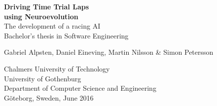 \begin{titlepage}
			
\addtolength{\voffset}{2cm}

\begin{figure}[H]
\centering
\vspace{1cm}	%
\end{figure}
\setlength{\parindent}{0ex}
\mbox{}
\vfill
\renewcommand{\familydefault}{\sfdefault} \normalfont %


\textbf{{\Huge Driving Time Trial Laps \\using Neuroevolution}} 	\\[0.5cm]
{\Large The development of a racing AI}\\[0.5cm]
Bachelor's thesis in Software Engineering \setlength{\parskip}{1cm}

{\large Gabriel Alpsten, Daniel Eineving, Martin Nilsson \& Simon Petersson} \setlength{\parskip}{2.9cm}

Chalmers University of Technology\\
University of Gothenburg\\
Department of Computer Science and Engineering\\
Göteborg, Sweden, June 2016\\


\renewcommand{\familydefault}{\rmdefault} \normalfont %
\end{titlepage}


\newpage
\restoregeometry
\thispagestyle{empty}
\mbox{}


